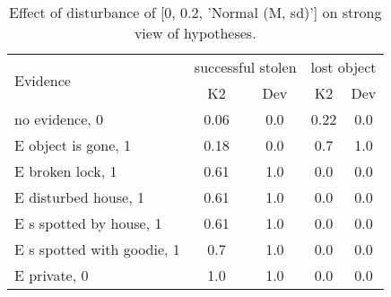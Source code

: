 \begin{table}\begin{tabular}{l|cc|cc}\toprule\multirow{2}{*}{Evidence} & \multicolumn{2}{c}{successful stolen}& \multicolumn{2}{c}{lost object}\\& {K2} & {Dev}& {K2} & {Dev}\\\midrule
no evidence, 0 & \cellcolor{Bittersweet}0.06&\cellcolor{Bittersweet}0.0&\cellcolor{Bittersweet}0.22&\cellcolor{Bittersweet}0.0\\E object is gone, 1 & \cellcolor{Bittersweet}0.18&\cellcolor{Bittersweet}0.0&\cellcolor{Bittersweet}0.7&\cellcolor{Bittersweet}1.0\\E broken lock, 1 & 0.61&1.0&\cellcolor{Bittersweet}0.0&\cellcolor{Bittersweet}0.0\\E disturbed house, 1 & 0.61&1.0&\cellcolor{Bittersweet}0.0&\cellcolor{Bittersweet}0.0\\E s spotted by house, 1 & 0.61&1.0&\cellcolor{Bittersweet}0.0&\cellcolor{Bittersweet}0.0\\E s spotted with goodie, 1 & \cellcolor{Bittersweet}0.7&\cellcolor{Bittersweet}1.0&\cellcolor{Bittersweet}0.0&\cellcolor{Bittersweet}0.0\\E private, 0 & \cellcolor{Bittersweet}1.0&\cellcolor{Bittersweet}1.0&\cellcolor{Bittersweet}0.0&\cellcolor{Bittersweet}0.0\\\bottomrule\end{tabular}\caption{Effect of disturbance of [0, 0.2, 'Normal (M, sd)'] on strong view of hypotheses.}\end{table}